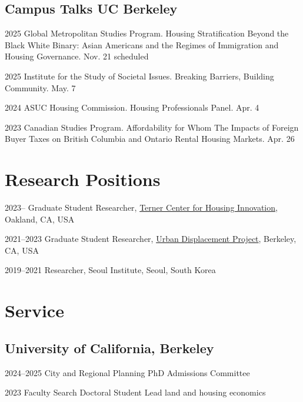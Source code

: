 \documentclass[10pt,letterpaper]{article}
\begin{document}
\subsection{Campus Talks UC Berkeley}
\begin{tablist}
  \item[2025] \tab{}Global Metropolitan Studies Program. Housing Stratification Beyond the Black White Binary: Asian Americans and the Regimes of Immigration and Housing Governance. Nov. 21 scheduled
  \item[2025] \tab{}Institute for the Study of Societal Issues. Breaking Barriers, Building Community. May. 7
  \item[2024] \tab{}ASUC Housing Commission. Housing Professionals Panel. Apr. 4
  \item[2023] \tab{}Canadian Studies Program. Affordability for Whom The Impacts of Foreign Buyer Taxes on British Columbia and Ontario Rental Housing Markets. Apr. 26
\end{tablist}

\section{Research Positions}

\begin{tablist}
  \item[2023– ] \tab{}Graduate Student Researcher, \href{https://ternercenter.berkeley.edu/}{Terner Center for Housing Innovation}, Oakland, CA, USA
  \item[2021–2023] \tab{}Graduate Student Researcher, \href{https://www.urbandisplacement.org/}{Urban Displacement Project}, Berkeley, CA, USA
  \item[2019–2021] \tab{}Researcher, Seoul Institute, Seoul, South Korea
\end{tablist}

\section{Service}

\subsection{University of California, Berkeley}
\begin{tablist}
  \item[2024–2025] \tab{}City and Regional Planning PhD Admissions Committee
  \item[2023] \tab{}Faculty Search Doctoral Student Lead land and housing economics
\end{tablist}
\end{document}
